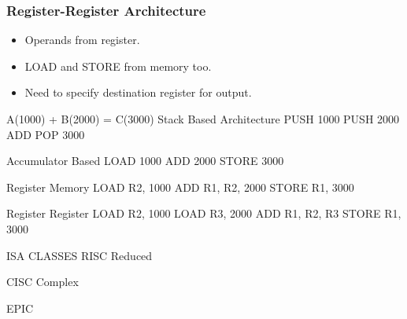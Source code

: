 \documentclass{article}
\begin{document}
		\subsubsection{Register-Register Architecture}
			\begin{itemize}
				\item Operands from register.
				\item LOAD and STORE from memory too.
				\item Need to specify destination register for output.
			\end{itemize}

		A(1000) + B(2000) = C(3000)
			Stack Based Architecture
				PUSH 1000
				PUSH 2000
				ADD
				POP 3000

			Accumulator Based
				LOAD 1000
				ADD 2000
				STORE 3000

			Register Memory
				LOAD R2, 1000
				ADD R1, R2, 2000
				STORE R1, 3000

			Register Register
				LOAD R2, 1000
				LOAD R3, 2000
				ADD R1, R2, R3
				STORE R1, 3000


		ISA CLASSES
			RISC
				Reduced

			CISC
				Complex

			EPIC


		
\end{document}
